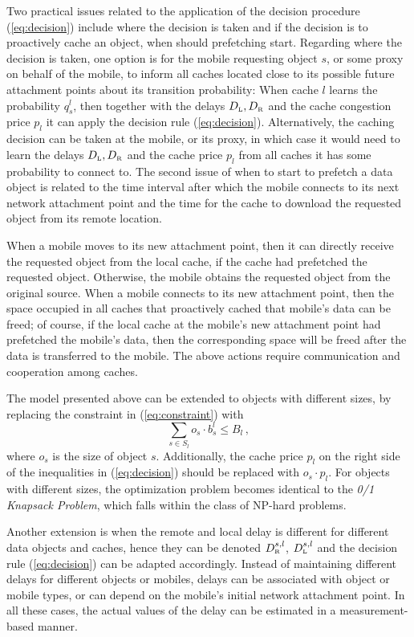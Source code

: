 \documentclass[conference]{IEEEtran}
\newcommand{\Leaf}{\mbox{\tiny L}}
\newcommand{\R}{\mbox{\tiny R}}
\begin{document}
Two practical issues related to the application of the  decision procedure (\ref{eq:decision}) include where the decision is taken and if the decision is to proactively cache an object, when should prefetching start.
Regarding where the decision is taken, one option is for the mobile requesting object $s$, or some proxy on behalf of the mobile, to inform all  caches located close to its possible future attachment points about its transition probability: When cache $l$ learns the probability $q^l_s$, then together with the delays $D_{\Leaf}, D_{\R}$ and the cache congestion price $p_l$ it can apply the decision rule (\ref{eq:decision}). Alternatively, the  caching decision can be taken at the mobile, or its proxy, in which case it would need to learn the delays $D_{\Leaf}, D_{\R}$ and the cache  price $p_l$ from all caches it has some probability to connect to.
The second issue of when to start to prefetch a data object is related to the time interval after which the mobile connects to its next network attachment point and the time for the cache to download the requested object from its remote location.

When a mobile moves to its new attachment point, then it can directly receive the requested object from the local cache, if the cache had prefetched the requested  object. Otherwise, the mobile  obtains the requested object from the original source. When a mobile connects to its new attachment point, then the space occupied in all caches that proactively  cached that mobile's data can be freed; of course, if the local cache at the mobile's new attachment point had prefetched the mobile's data, then the corresponding space will be freed after the data is transferred to the mobile. The above actions require communication and cooperation among caches.

The  model presented above can be extended to objects with different sizes, by replacing the constraint in (\ref{eq:constraint}) with
$$
\sum_{s \in S_l} o_s \cdot b^l_s  \leq B_l \, ,
$$
where $o_s$ is the size of  object $s$.
Additionally,  the cache price $p_l$ on the right side of the inequalities in (\ref{eq:decision}) should be replaced with $o_s \cdot p_l $.
For objects with different sizes, the optimization problem becomes identical to the \emph{0/1 Knapsack Problem}, which falls within the class of NP-hard problems.


Another extension is when the remote and local delay is different for different data objects and caches, hence they can be denoted $D_{\R}^{s,l}$, $D_{\Leaf}^{s,l}$ and the
decision rule (\ref{eq:decision}) can be adapted accordingly. Instead of maintaining different delays  for different objects or mobiles, delays can be associated with  object or mobile types, or can depend on the mobile's initial network attachment point. In all these cases, the actual values of the delay can be estimated in a measurement-based manner.
\end{document}
